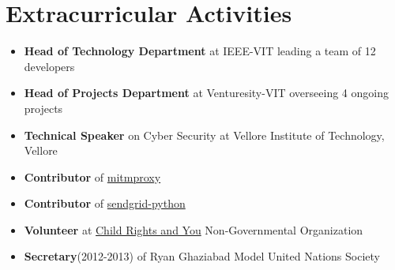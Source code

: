 \documentclass[a4paper,1pt]{article}
\begin{document}
\section{Extracurricular Activities}{\raggedbottom}
\begin{itemize}
    \item \textbf{Head of Technology Department} at IEEE-VIT leading a team of 12 developers
\item \textbf{Head of Projects Department} at Venturesity-VIT overseeing 4 ongoing projects
\item \textbf{Technical Speaker} on Cyber Security at Vellore Institute of Technology, Vellore
\item \textbf{Contributor} of \href{https://github.com/mitmproxy/mitmproxy}{mitmproxy}
\item \textbf{Contributor} of \href{https://github.com/sendgrid/sendgrid-python}{sendgrid-python}
\item \textbf{Volunteer} at \href{https://www.cry.org/}{Child Rights and You} Non-Governmental Organization
\item \textbf{Secretary}(2012-2013) of Ryan Ghaziabad Model United Nations Society
\end{itemize}
\end{document}
